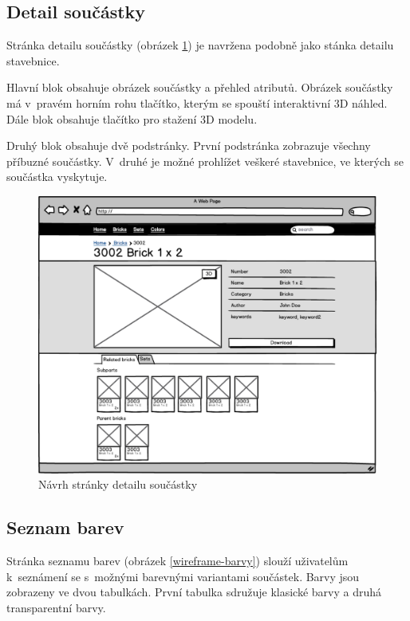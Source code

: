 \subsection{Detail součástky}
Stránka detailu součástky (obrázek \ref{wireframe-soucastka-detail}) je navržena podobně jako stánka detailu stavebnice. 

Hlavní blok obsahuje obrázek součástky a přehled atributů. Obrázek součástky má v~pravém horním rohu tlačítko, kterým se spouští interaktivní 3D náhled. Dále blok obsahuje tlačítko pro stažení 3D modelu. 

Druhý blok obsahuje dvě podstránky. První podstránka zobrazuje všechny příbuzné součástky. V~druhé je možné prohlížet veškeré stavebnice, ve kterých se součástka vyskytuje.

\begin{figure}[htbp]
    \centering
    \includegraphics[width=\textwidth,height=\textheight,keepaspectratio]{pdfs/wireframe_brick.pdf}
    \caption{Návrh stránky detailu součástky}\label{wireframe-soucastka-detail}
\end{figure}

\subsection{Seznam barev}
Stránka seznamu barev (obrázek \ref{wireframe-barvy}) slouží uživatelům k~seznámení se s~možnými barevnými variantami součástek. Barvy jsou zobrazeny ve dvou tabulkách. První tabulka sdružuje klasické barvy a druhá transparentní barvy. 

